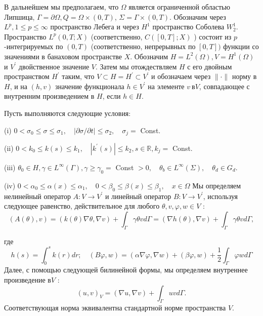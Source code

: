     В дальнейшем мы предполагаем, что $\Omega $ является ограниченной областью Липшица,
    $\Gamma =\partial \Omega, Q =\Omega \times(0, T)$, $\Sigma=\Gamma \times(0, T)$.
    Обозначим через $L ^ {p}, 1 \leq p \leq \infty$ пространство Лебега и через $H^{1}$
    пространство Соболева $W_{2}^{1}$.
    Пространство $L ^ {p}(0, T ; X)$ (соответственно, $C([0, T] ; X)$ ) состоит из
    $p$-интегрируемых по $(0, T)$ (соответственно, непрерывных по $[0, T])$ функции со значениями
    в банаховом пространстве $X$.
    Обозначим $H=L ^{2}(\Omega), V=H^{1} (\Omega)$ и $V ^ {\prime}$ двойственное значение $V$.
    Затем мы отождествляем $H $ с его двойным пространством $H ^ {\prime}$ таким,
    что $V \subset H = H ^ {\prime} \subset V ^ {\prime}$ и обозначаем
    через $ \|\cdot \|$ норму в $H$, и на $(h, v)$ значение функционала $h \in V ^ {\prime}$
    на элементе $v \ в V$, совпадающее с внутренним произведением в $H$, если $h \in H$.


    Пусть выполняются следующие условия:

    (i) $0<\sigma_{0} \leq \sigma \leq \sigma_{1}, \quad|\partial \sigma / \partial t| \leq \sigma_{2}, \quad \sigma_{j}=$ Const.

    (ii) $0<k_{0} \leq k(s) \leq k_{1}, \quad\left|k^{\prime}(s)\right| \leq k_{2}, s \in \mathbb{R}, k_{j}=$ Const.

    (iii) $\theta_{0} \in H, \gamma \in L^{\infty}(\Gamma), \gamma \geq \gamma_{0}=$ Const $>0, \quad \theta_{b} \in L^{\infty}(\Sigma), \quad \theta_{d} \in G_{d}$.

    (iv) $0<\alpha_{0} \leq \alpha(x) \leq \alpha_{1}, \quad 0<\beta_{0} \leq \beta(x) \leq \beta_{1}, \quad x \in \Omega$
    Мы определяем нелинейный оператор $A:V\rightarrow V^{\prime}$
    и линейный оператор $B:V\rightarrow V ^ {\prime}$,
    используя следующее равенство, действительное для любого $\theta, v, \varphi, w \in V$ :
    \[
        (A(\theta), v)=(k(\theta) \nabla \theta, \nabla v)+\int_{\Gamma} \gamma \theta v d
        \Gamma=(\nabla h(\theta), \nabla v)+\int_{\Gamma} \gamma \theta v d \Gamma,
    \]

    где%
    \[
        h(s)=\int_{0}^{s} k(r) d r ; \quad(B \varphi, w)=
        (\alpha \nabla \varphi, \nabla w)+(\beta \varphi, w)+\frac{1}{2} \int_{\Gamma} \varphi w d \Gamma
    \]
    Далее, с помощью следующей билинейной формы, мы определяем внутреннее произведение в$V$ :
    \[
        (u, v)_{V}=(\nabla u, \nabla v)+\int_{\Gamma} u v d \Gamma.
    \]
    Соответствующая норма эквивалентна стандартной норме пространства $V$.

